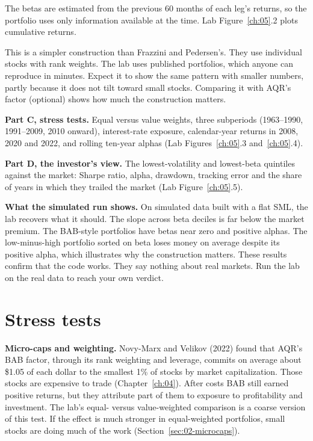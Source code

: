 The betas are estimated from the previous 60 months of each leg's returns, so the portfolio uses only information available at the time. Lab Figure~\ref{ch:05}.2 plots cumulative returns.

This is a simpler construction than Frazzini and Pedersen's. They use individual stocks with rank weights. The lab uses published portfolios, which anyone can reproduce in minutes. Expect it to show the same pattern with smaller numbers, partly because it does not tilt toward small stocks. Comparing it with AQR's factor (optional) shows how much the construction matters.

\textbf{Part C, stress tests.} Equal versus value weights, three subperiods (1963--1990, 1991--2009, 2010 onward), interest-rate exposure, calendar-year returns in 2008, 2020 and 2022, and rolling ten-year alphas (Lab Figures~\ref{ch:05}.3 and~\ref{ch:05}.4).

\textbf{Part D, the investor's view.} The lowest-volatility and lowest-beta quintiles against the market: Sharpe ratio, alpha, drawdown, tracking error and the share of years in which they trailed the market (Lab Figure~\ref{ch:05}.5).

\textbf{What the simulated run shows.} On simulated data built with a flat SML, the lab recovers what it should. The slope across beta deciles is far below the market premium. The BAB-style portfolios have betas near zero and positive alphas. The low-minus-high portfolio sorted on beta loses money on average despite its positive alpha, which illustrates why the construction matters. These results confirm that the code works. They say nothing about real markets. Run the lab on the real data to reach your own verdict.

\section{Stress tests}
\label{sec:05-stress}

\textbf{Micro-caps and weighting.} Novy-Marx and Velikov (2022) found that AQR's BAB factor, through its rank weighting and leverage, commits on average about \$1.05 of each dollar to the smallest 1\% of stocks by market capitalization. Those stocks are expensive to trade (Chapter~\ref{ch:04}). After costs BAB still earned positive returns, but they attribute part of them to exposure to profitability and investment. The lab's equal- versus value-weighted comparison is a coarse version of this test. If the effect is much stronger in equal-weighted portfolios, small stocks are doing much of the work (Section~\ref{sec:02-microcaps}).

